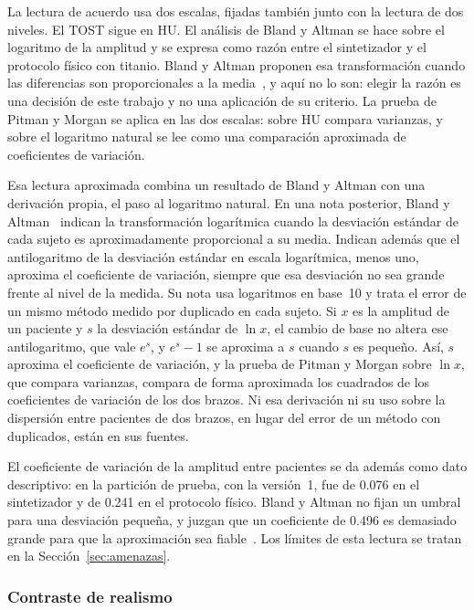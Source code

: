 La lectura de acuerdo usa dos escalas, fijadas también junto con la lectura de dos niveles. El TOST sigue en HU. El análisis de Bland y Altman se hace sobre el logaritmo de la amplitud y se expresa como razón entre el sintetizador y el protocolo físico con titanio. Bland y Altman proponen esa transformación cuando las diferencias son proporcionales a la media~\cite{bland1986statisticalmeasurement}, y aquí no lo son: elegir la razón es una decisión de este trabajo y no una aplicación de su criterio. La prueba de Pitman y Morgan se aplica en las dos escalas: sobre HU compara varianzas, y sobre el logaritmo natural se lee como una comparación aproximada de coeficientes de variación.

Esa lectura aproximada combina un resultado de Bland y Altman con una derivación propia, el paso al logaritmo natural. En una nota posterior, Bland y Altman~\cite{bland1996statisticsmeasurement} indican la transformación logarítmica cuando la desviación estándar de cada sujeto es aproximadamente proporcional a su media. Indican además que el antilogaritmo de la desviación estándar en escala logarítmica, menos uno, aproxima el coeficiente de variación, siempre que esa desviación no sea grande frente al nivel de la medida. Su nota usa logaritmos en base~10 y trata el error de un mismo método medido por duplicado en cada sujeto. Si $x$ es la amplitud de un paciente y $s$ la desviación estándar de $\ln x$, el cambio de base no altera ese antilogaritmo, que vale $e^{s}$, y $e^{s} - 1$ se aproxima a $s$ cuando $s$ es pequeño. Así, $s$ aproxima el coeficiente de variación, y la prueba de Pitman y Morgan sobre $\ln x$, que compara varianzas, compara de forma aproximada los cuadrados de los coeficientes de variación de los dos brazos. Ni esa derivación ni su uso sobre la dispersión entre pacientes de dos brazos, en lugar del error de un método con duplicados, están en sus fuentes.

El coeficiente de variación de la amplitud entre pacientes se da además como dato descriptivo: en la partición de prueba, con la versión~1, fue de 0.076 en el sintetizador y de 0.241 en el protocolo físico. Bland y Altman no fijan un umbral para una desviación pequeña, y juzgan que un coeficiente de 0.496 es demasiado grande para que la aproximación sea fiable~\cite{bland1996statisticsmeasurement}. Los límites de esta lectura se tratan en la Sección~\ref{sec:amenazas}.

\subsubsection{Contraste de realismo}\label{sec:ap-realismo}

